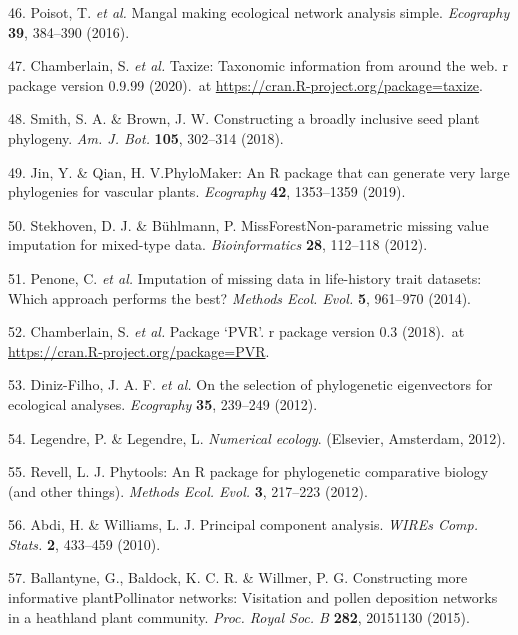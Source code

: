 \documentclass[12pt,a4paper,]{article}
\begin{document}
\hypertarget{ref-poisot2016}{}
46. Poisot, T. \emph{et al.} Mangal making ecological network analysis
simple. \emph{Ecography} \textbf{39}, 384--390 (2016).

\hypertarget{ref-chamberlain2020}{}
47. Chamberlain, S. \emph{et al.} Taxize: Taxonomic information from
around the web. r package version 0.9.99 (2020).~at
\href{https://CRAN.R-project.org/package=taxize}{https://cran.R-project.org/package=taxize}.

\hypertarget{ref-smith2018}{}
48. Smith, S. A. \& Brown, J. W. Constructing a broadly inclusive seed
plant phylogeny. \emph{Am. J. Bot.} \textbf{105}, 302--314 (2018).

\hypertarget{ref-jin2019}{}
49. Jin, Y. \& Qian, H. V.PhyloMaker: An R package that can generate
very large phylogenies for vascular plants. \emph{Ecography}
\textbf{42}, 1353--1359 (2019).

\hypertarget{ref-stekhoven2012}{}
50. Stekhoven, D. J. \& Bühlmann, P. MissForestNon-parametric missing
value imputation for mixed-type data. \emph{Bioinformatics} \textbf{28},
112--118 (2012).

\hypertarget{ref-penone2014}{}
51. Penone, C. \emph{et al.} Imputation of missing data in life-history
trait datasets: Which approach performs the best? \emph{Methods Ecol.
Evol.} \textbf{5}, 961--970 (2014).

\hypertarget{ref-santos2018}{}
52. Chamberlain, S. \emph{et al.} Package `PVR'. r package version 0.3
(2018).~at
\href{https://CRAN.R-project.org/package=PVR}{https://cran.R-project.org/package=PVR}.

\hypertarget{ref-diniz-filho2012}{}
53. Diniz-Filho, J. A. F. \emph{et al.} On the selection of phylogenetic
eigenvectors for ecological analyses. \emph{Ecography} \textbf{35},
239--249 (2012).

\hypertarget{ref-legendre2012}{}
54. Legendre, P. \& Legendre, L. \emph{Numerical ecology}. (Elsevier,
Amsterdam, 2012).

\hypertarget{ref-revell2012}{}
55. Revell, L. J. Phytools: An R package for phylogenetic comparative
biology (and other things). \emph{Methods Ecol. Evol.} \textbf{3},
217--223 (2012).

\hypertarget{ref-abdi2010}{}
56. Abdi, H. \& Williams, L. J. Principal component analysis.
\emph{WIREs Comp. Stats.} \textbf{2}, 433--459 (2010).

\hypertarget{ref-ballantyne2015}{}
57. Ballantyne, G., Baldock, K. C. R. \& Willmer, P. G. Constructing
more informative plantPollinator networks: Visitation and pollen
deposition networks in a heathland plant community. \emph{Proc. Royal
Soc. B} \textbf{282}, 20151130 (2015).
\end{document}
